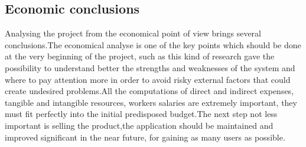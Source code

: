 \subsection{Economic conclusions}
Analysing the project from the economical point of view brings several conclusions.The economical analyse is one of the key points which should be done at the very beginning of the project, such as this kind of research gave the possibility to understand better the strengths and weaknesses of the system and where to pay attention more in order to avoid risky external factors that could create undesired problems.All the computations of direct and indirect expenses, tangible and intangible resources, workers salaries are extremely important, they must fit perfectly into the initial predisposed budget.The next step not less important is selling the product,the application should be maintained and improved significant in the near future, for gaining as many users as possible.

\clearpage